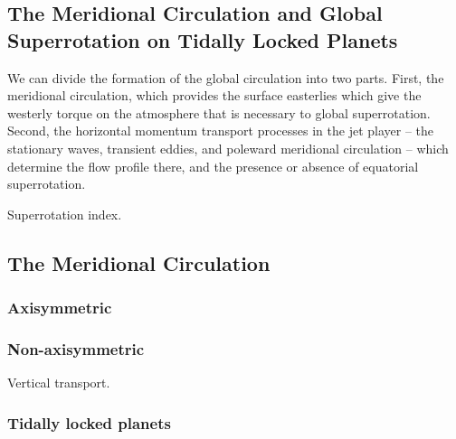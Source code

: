 \begin{SingleSpace}
\chapter{The Meridional Circulation and Global Superrotation on Tidally Locked Planets}\label{ch:eqm-circulation-states}
\vspace{0.5cm}
\end{SingleSpace}
\vspace{0.5cm}


We can divide the formation of the global circulation into two parts. First, the meridional circulation, which provides the surface easterlies which give the westerly torque on the atmosphere that is necessary to global superrotation. Second, the horizontal momentum transport processes in the jet player -- the stationary waves, transient eddies, and poleward meridional circulation -- which determine the flow profile there, and the presence or absence of equatorial superrotation.

Superrotation index.









\section{The Meridional Circulation}

\subsection*{Axisymmetric}

\subsection*{Non-axisymmetric}

Vertical transport.

\subsection*{Tidally locked planets}

